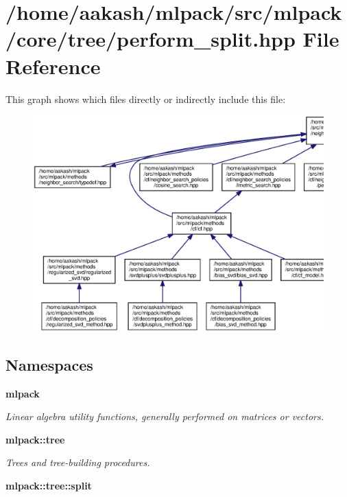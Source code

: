\section{/home/aakash/mlpack/src/mlpack/core/tree/perform\+\_\+split.hpp File Reference}
\label{perform__split_8hpp}
This graph shows which files directly or indirectly include this file\+:
\nopagebreak
\begin{figure}[H]
\begin{center}
\leavevmode
\includegraphics[width=350pt]{perform__split_8hpp__dep__incl}
\end{center}
\end{figure}
\subsection*{Namespaces}
\begin{DoxyCompactItemize}
\item 
 \textbf{ mlpack}
\begin{DoxyCompactList}\small\item\em Linear algebra utility functions, generally performed on matrices or vectors. \end{DoxyCompactList}\item 
 \textbf{ mlpack\+::tree}
\begin{DoxyCompactList}\small\item\em Trees and tree-\/building procedures. \end{DoxyCompactList}\item 
 \textbf{ mlpack\+::tree\+::split}
\end{DoxyCompactItemize}
